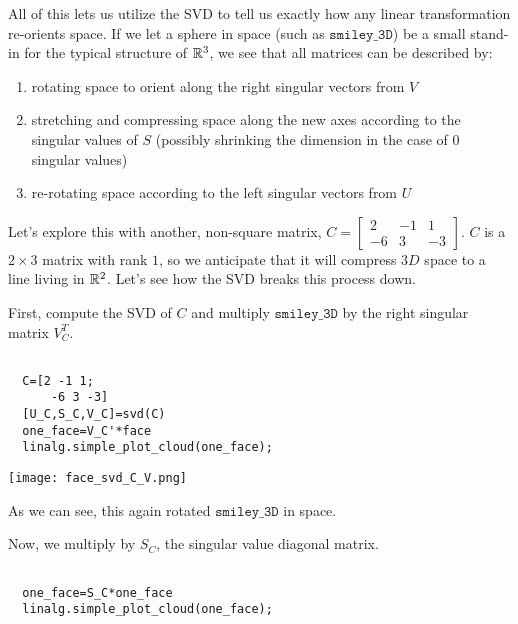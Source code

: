 \documentclass{ximera}
\begin{document}
\begin{problem}
\begin{problem}
All of this lets us utilize the SVD to tell us exactly how any linear transformation re-orients space. If we let a sphere in space (such as $\texttt{smiley\_3D}$) be a small stand-in for the typical structure of $\mathbb{R}^3$, we see that all matrices can be described by:

\begin{enumerate}

  \item rotating space to orient along the right singular vectors from $V$
  \item stretching and compressing space along the new axes according to the singular values of $S$ (possibly shrinking the dimension in the case of $0$ singular values)
  \item re-rotating space according to the left singular vectors from $U$

\end{enumerate}

Let's explore this with another, non-square matrix, $C=\begin{bmatrix}
  2 & -1 & 1\\
  -6 & 3 & -3
\end{bmatrix}$. $C$ is a $2\times 3$ matrix with rank $1$, so we anticipate that it will compress $3D$ space to a line living in $\mathbb{R}^2$. Let's see how the SVD breaks this process down.

First, compute the SVD of $C$ and multiply $\texttt{smiley_3D}$ by the right singular matrix $V_C^T$.

\begin{verbatim}

  C=[2 -1 1;
      -6 3 -3]
  [U_C,S_C,V_C]=svd(C)
  one_face=V_C'*face
  linalg.simple_plot_cloud(one_face);

\end{verbatim}

\begin{center}
  \texttt{[image: face\_svd\_C\_V.png]}
\end{center}

As we can see, this again rotated $\texttt{smiley\_3D}$ in space.

Now, we multiply by $S_C$, the singular value diagonal matrix.

\begin{verbatim}

  one_face=S_C*one_face
  linalg.simple_plot_cloud(one_face);

\end{verbatim}


\end{problem}
\end{problem}
\end{document}
